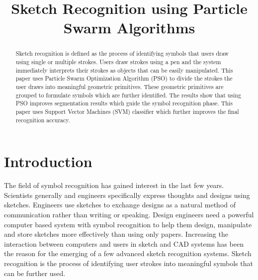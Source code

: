 \documentclass{article}
\title{Sketch Recognition using Particle Swarm Algorithms}
\begin{document}
\maketitle
\begin{abstract}
Sketch recognition is defined as the process of identifying symbols that users draw using single or multiple strokes. Users draw strokes using a pen and the system immediately interprets their strokes as objects that can be easily manipulated. This paper uses Particle Swarm Optimization Algorithm (PSO) to divide the strokes the user draws into meaningful geometric primitives. These geometric primitives are grouped to formulate symbols which are further identified. The results show that using PSO improves segmentation results which guide the symbol recognition phase. This paper uses Support Vector Machines (SVM) classifier which further improves the final recognition accuracy.  
\end{abstract}
\section{Introduction}
The field of symbol recognition has gained interest in the last few years. Scientists generally and engineers specifically express thoughts and designs using sketches. Engineers use sketches to exchange designs as a natural method of communication rather than writing or speaking. Design engineers need a powerful computer based system with symbol recognition to help them design, manipulate and store sketches more effectively than using only papers. Increasing the interaction between computers and users in sketch and CAD systems has been the reason for the emerging of a few advanced sketch recognition systems. Sketch recognition is the process of identifying user strokes into meaningful symbols that can be further used.  
\end{document}
